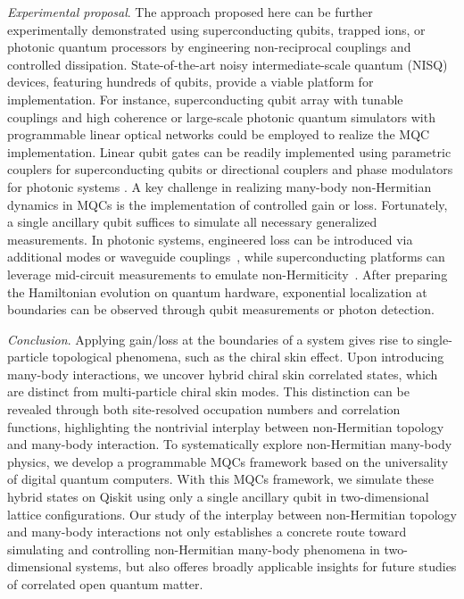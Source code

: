 \documentclass[longbibliography, aps, prx, amsmath, amssymb, amsfonts, twocolumn,superscriptaddress, footinbib]{revtex4-1}
\begin{document}
	\textit{Experimental proposal}. The approach proposed here can be further experimentally demonstrated using superconducting qubits, trapped ions, or photonic quantum processors by engineering non-reciprocal couplings and controlled dissipation. State-of-the-art noisy intermediate-scale quantum (NISQ) devices, featuring hundreds of qubits, provide a viable platform for implementation. For instance, superconducting qubit array with tunable couplings and high coherence \cite{guo2021observation, preskill2018quantum, wu2021strong} or large-scale photonic quantum simulators with programmable linear optical networks \cite{zhong2020quantum, madsen2022quantum, zhu2024dynamically} could be employed to realize the MQC implementation. Linear qubit gates can be readily implemented using parametric couplers for superconducting qubits or directional couplers and phase modulators for photonic systems \cite{zhu2024large}. A key challenge in realizing many-body non-Hermitian dynamics in MQCs is the implementation of controlled gain or loss. Fortunately, a single ancillary qubit suffices to simulate all necessary generalized measurements. In photonic systems, engineered loss can be introduced via additional modes or waveguide couplings~\cite{hoch2025quantum, carolan2020variational}, while superconducting platforms can leverage mid-circuit measurements to emulate non-Hermiticity~\cite{shen2024enhanced,shen2025observation}. After preparing the Hamiltonian evolution on quantum hardware, exponential localization at boundaries can be observed through qubit measurements or photon detection. {\color{blue}{Therefore, our proposal can be directly implemented in state-of-the-art superconducting and photonic quantum platforms. }}

	\textit{Conclusion}. Applying gain/loss at the boundaries of a system gives rise to single-particle topological phenomena, such as the chiral skin effect. Upon introducing many-body interactions, we uncover hybrid chiral skin correlated states, which are distinct from multi-particle chiral skin modes. This distinction can be revealed through both site-resolved occupation numbers and correlation functions, highlighting the nontrivial interplay between non-Hermitian topology and many-body interaction. 
	To systematically explore non-Hermitian many-body physics, we develop a programmable MQCs framework based on the universality of digital quantum computers. 
	With this MQCs framework, we simulate these hybrid states on Qiskit using only a single ancillary qubit in two-dimensional lattice configurations. 
	Our study of the interplay between non-Hermitian topology and many-body interactions not only establishes a concrete route toward simulating and controlling non-Hermitian many-body phenomena in two-dimensional systems, but also offeres broadly applicable insights for future studies of correlated open quantum matter.
\end{document}
